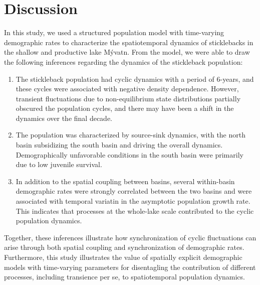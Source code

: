 

\section*{Discussion}

In this study, we used a structured population model 
with time-varying demographic rates to characterize the 
spatiotemporal dynamics of sticklebacks in the shallow and productive lake M\'{y}vatn.
From the model, we were able to draw the following inferences regarding the 
dynamics of the stickleback population:
%
\begin{enumerate}[label=(\alph*)]
\item
The stickleback population had cyclic dynamics with a period of 6-years,
and these cycles were associated with negative density dependence.
However, transient fluctuations due to non-equilibrium state distributions
partially obscured the population cycles,
and there may have been a shift in the dynamics over the final decade.
%
\item
The population was characterized by source-sink dynamics, 
with the north basin subsidizing the south basin and driving the overall dynamics. 
Demographically unfavorable conditions in the south basin were 
primarily due to low juvenile survival.
%
\item
In addition to the spatial coupling between basins,
several within-basin demographic rates were strongly correlated 
between the two basins and 
were associated with temporal variatin in the asymptotic population growth rate.
This indicates that processes at the whole-lake scale contributed 
to the cyclic population dynamics.
\end{enumerate}
%
Together, these inferences illustrate how synchronization of cyclic fluctuations 
can arise through both spatial coupling and synchronization of demographic rates.
Furthermore, this study illustrates the value of spatially explicit demographic models 
with time-varying parameters for disentagling the contribution of different processes,
including transience per se, to spatiotemporal population dynamics.


